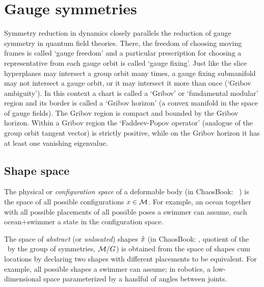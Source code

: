 
\chapter{Gauge symmetries}
\label{c:gauge}

\renewcommand{\sspRed}{\ensuremath{\hat{\ssp}}}
\renewcommand{\LieEl}{\ensuremath{g}}  %

Symmetry reduction in dynamics closely parallels the reduction of gauge symmetry in
quantum field theories. There, the freedom of choosing moving frames
 is called `gauge freedom' and a
particular prescription for choosing a representative from each gauge
orbit is called `gauge fixing'. Just like the slice hyperplanes
may intersect a group orbit many times, a gauge
fixing submanifold may not intersect a gauge orbit, or it may intersect
it more than once (`Gribov ambiguity'). In this
context a chart is called a `Gribov' or `fundamental modular' region and
its border is called a `Gribov horizon' (a convex manifold in the
space of gauge fields). The Gribov region is compact and bounded by the
Gribov horizon. Within a Gribov region the `Faddeev-Popov operator'
(analogue of the group orbit tangent vector) is strictly positive, while on
the Gribov horizon it has at least one vanishing eigenvalue.


\section{Shape space}
\label{sec:shapesp}


The physical or \emph{configuration space} of a deformable body (in
ChaosBook: \statesp\ {\pS}) is the space of all possible configurations
$x \in \mathcal{M}$. For example, an ocean together with all possible
placements of all possible poses a swimmer can assume, each ocean+swimmer
a state in the configuration space.

The space of \emph{abstract} (or \emph{unlocated}) shapes $\sspRed$ (in
ChaosBook: {\reducedsp} {\pSRed}, quotient of the \statesp\ by the group
of symmetries, $\mathcal{M}/G$) is obtained from the space of shapes cum
locations by declaring two shapes with different placements to be
equivalent. For example, all possible shapes a swimmer can assume; in
robotics, a low-dimensional space parameterized by a handful of angles
between joints.

